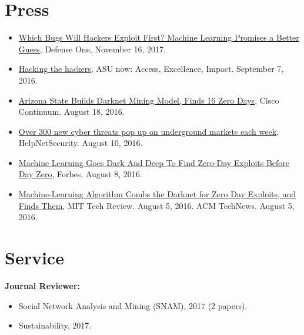 \documentclass[margin,line]{CV}
\begin{document}
\begin{resume}
\section{\sc Press}
\begin{itemize}[leftmargin=*]
	
\item 
\href{http://www.defenseone.com/technology/2017/11/which-bugs-will-hackers-exploit-first-machine-learning-promises-better-guess/142621/?oref=d-channeltop}{Which Bugs Will Hackers Exploit First? Machine Learning Promises a Better Guess}, Defense One, November 16, 2017.

\item \href{https://asunow.asu.edu/20160907-solutions-asu-researchers-hacking-hackers-new-approach}{Hacking the hackers}, ASU now: Access, Excellence, Impact. September 7, 2016.

\item \href{https://continuum.cisco.com/2016/08/18/arizona-state-builds-darknet-mining-model-finds-16-zero-days/}{Arizona State Builds Darknet Mining Model, Finds 16 Zero Days}, Cisco Continuum. August 18, 2016.

\item \href{https://www.helpnetsecurity.com/2016/08/10/cyber-threats-underground-markets/}{Over 300 new cyber threats pop up on underground markets each week}, HelpNetSecurity. August 10, 2016.

\item \href{http://www.forbes.com/sites/kevinmurnane/2016/08/08/machine-learning-goes-dark-and-deep-to-find-zero-day-exploits-before-day-zero/#49b6e2706d76}{ Machine Learning Goes Dark And Deep To Find Zero-Day Exploits Before Day Zero}, Forbes. August 8, 2016.

\item \href{https://www.technologyreview.com/s/602115/machine-learning-algorithm-combs-the-darknet-for-zero-day-exploits-and-finds-them/}{ Machine-Learning Algorithm Combs the Darknet for Zero Day Exploits, and Finds Them},
MIT Tech Review. August 5, 2016. ACM TechNews. August 5, 2016.

\end{itemize}

\section{\sc Service}
{\bf Journal Reviewer:}
\begin{itemize}
	\item Social Network Analysis and Mining (SNAM), 2017 (2 papers).
	\item Sustainability, 2017. 
\end{itemize}


\end{resume}
\end{document}
